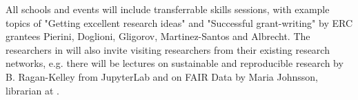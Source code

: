All schools and events will include transferrable skills sessions, with example topics of "Getting excellent research ideas" and "Successful grant-writing" by \acronym ERC grantees Pierini, Doglioni, Gligorov, Martinez-Santos and Albrecht. 
The researchers in \acronym will also invite visiting researchers from their existing research networks, e.g. there will be lectures on sustainable and reproducible research by B. Ragan-Kelley from JupyterLab and on FAIR Data by Maria Johnsson, librarian at \lundentity. 
%



